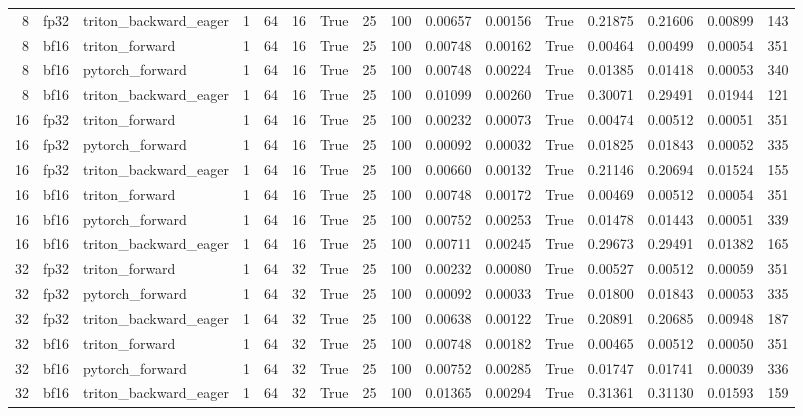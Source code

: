 \begin{tabular}{rllrrrrrrrrrrrrr}
8 & fp32 & triton\_backward\_eager & 1 & 64 & 16 & True & 25 & 100 & 0.00657 & 0.00156 & True & 0.21875 & 0.21606 & 0.00899 & 143 \\
8 & bf16 & triton\_forward & 1 & 64 & 16 & True & 25 & 100 & 0.00748 & 0.00162 & True & 0.00464 & 0.00499 & 0.00054 & 351 \\
8 & bf16 & pytorch\_forward & 1 & 64 & 16 & True & 25 & 100 & 0.00748 & 0.00224 & True & 0.01385 & 0.01418 & 0.00053 & 340 \\
8 & bf16 & triton\_backward\_eager & 1 & 64 & 16 & True & 25 & 100 & 0.01099 & 0.00260 & True & 0.30071 & 0.29491 & 0.01944 & 121 \\
16 & fp32 & triton\_forward & 1 & 64 & 16 & True & 25 & 100 & 0.00232 & 0.00073 & True & 0.00474 & 0.00512 & 0.00051 & 351 \\
16 & fp32 & pytorch\_forward & 1 & 64 & 16 & True & 25 & 100 & 0.00092 & 0.00032 & True & 0.01825 & 0.01843 & 0.00052 & 335 \\
16 & fp32 & triton\_backward\_eager & 1 & 64 & 16 & True & 25 & 100 & 0.00660 & 0.00132 & True & 0.21146 & 0.20694 & 0.01524 & 155 \\
16 & bf16 & triton\_forward & 1 & 64 & 16 & True & 25 & 100 & 0.00748 & 0.00172 & True & 0.00469 & 0.00512 & 0.00054 & 351 \\
16 & bf16 & pytorch\_forward & 1 & 64 & 16 & True & 25 & 100 & 0.00752 & 0.00253 & True & 0.01478 & 0.01443 & 0.00051 & 339 \\
16 & bf16 & triton\_backward\_eager & 1 & 64 & 16 & True & 25 & 100 & 0.00711 & 0.00245 & True & 0.29673 & 0.29491 & 0.01382 & 165 \\
32 & fp32 & triton\_forward & 1 & 64 & 32 & True & 25 & 100 & 0.00232 & 0.00080 & True & 0.00527 & 0.00512 & 0.00059 & 351 \\
32 & fp32 & pytorch\_forward & 1 & 64 & 32 & True & 25 & 100 & 0.00092 & 0.00033 & True & 0.01800 & 0.01843 & 0.00053 & 335 \\
32 & fp32 & triton\_backward\_eager & 1 & 64 & 32 & True & 25 & 100 & 0.00638 & 0.00122 & True & 0.20891 & 0.20685 & 0.00948 & 187 \\
32 & bf16 & triton\_forward & 1 & 64 & 32 & True & 25 & 100 & 0.00748 & 0.00182 & True & 0.00465 & 0.00512 & 0.00050 & 351 \\
32 & bf16 & pytorch\_forward & 1 & 64 & 32 & True & 25 & 100 & 0.00752 & 0.00285 & True & 0.01747 & 0.01741 & 0.00039 & 336 \\
32 & bf16 & triton\_backward\_eager & 1 & 64 & 32 & True & 25 & 100 & 0.01365 & 0.00294 & True & 0.31361 & 0.31130 & 0.01593 & 159 \\

\end{tabular}
